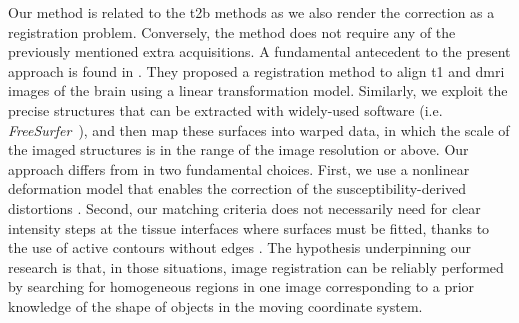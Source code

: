Our method is related to the \gls*{t2b} methods as we also render the correction as a
  registration problem.
Conversely, the method does not require any of the previously mentioned extra acquisitions.
A fundamental antecedent to the present approach is found in \citep{greve_accurate_2009}.
They proposed a registration method to align \gls*{t1} and \gls*{dmri} images
  of the brain using a linear transformation model.
Similarly, we exploit the precise structures that can be extracted with
  widely-used software (i.e. \emph{FreeSurfer}~\citep{fischl_freesurfer_2012}),
  and then map these surfaces into warped data, in which the scale of the
  imaged structures is in the range of the image resolution or above.
Our approach differs from \citep{greve_accurate_2009} in two fundamental choices.
First, we use a nonlinear deformation model that enables the correction of the
  susceptibility-derived distortions \citep{jezzard_correction_1995}.
Second, our matching criteria does not necessarily need for clear intensity
  steps at the tissue interfaces where surfaces must be fitted, thanks to the use of
  active contours without edges \citep{chan_active_2001}.
The hypothesis underpinning our research is that, in those situations,
  image registration can be reliably performed by searching for homogeneous
  regions in one image corresponding to a prior knowledge of the shape of objects in
  the moving coordinate system.
